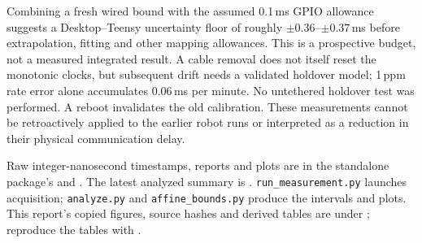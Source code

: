 Combining a fresh wired bound with the assumed 0.1\,ms GPIO allowance suggests a Desktop--Teensy uncertainty floor of roughly $\pm0.36$--$\pm0.37$\,ms before extrapolation, fitting and other mapping allowances. This is a prospective budget, not a measured integrated result. A cable removal does not itself reset the monotonic clocks, but subsequent drift needs a validated holdover model; 1\,ppm rate error alone accumulates 0.06\,ms per minute. No untethered holdover test was performed. A reboot invalidates the old calibration. These measurements cannot be retroactively applied to the earlier robot runs or interpreted as a reduction in their physical communication delay.

\begin{sloppypar}
Raw integer-nanosecond timestamps, reports and plots are in the standalone package's  and . The latest analyzed summary is . \texttt{run\_measurement.py} launches acquisition; \texttt{analyze.py} and \texttt{affine\_bounds.py} produce the intervals and plots. This report's copied figures, source hashes and derived tables are under ; reproduce the tables with .
\end{sloppypar}
